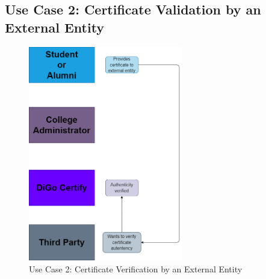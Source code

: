 \subsection{Use Case 2: Certificate Validation by an External Entity}

\begin{figure}[H]
    \centering
    \includegraphics[width=0.6\textwidth, height=0.6\textheight, keepaspectratio]{../diagrams/certificate-validation.drawio.png}
    \caption{Use Case 2: Certificate Verification by an External Entity}
    \label{fig:use-case-2}
\end{figure}

